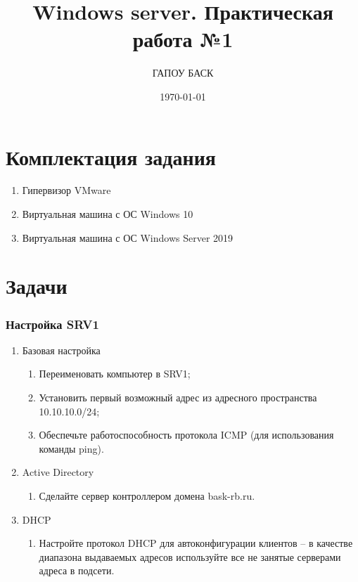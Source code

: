 \documentclass[a4paper, 12pt]{report}
\author{ГАПОУ БАСК}
\title{Windows server. Практическая работа №1}
\date{\today}
\begin{document}
	
	\maketitle
	\clearpage

	\section{Комплектация задания}

	\begin{enumerate}
		\item Гипервизор VMware
		\item Виртуальная машина с ОС Windows 10
		\item Виртуальная машина с ОС Windows Server 2019
	\end{enumerate}

	\section{Задачи}
	
	\subsubsection{Настройка SRV1}
	
	\begin{enumerate}
		\item Базовая настройка
		\begin{enumerate}
			\item Переименовать компьютер в SRV1;
			\item Установить первый возможный адрес из адресного пространства 10.10.10.0/24;
			\item Обеспечьте работоспособность протокола ICMP (для использования команды ping).
		\end{enumerate}
		\item Active Directory
		\begin{enumerate}
			\item Сделайте сервер контроллером домена bask-rb.ru.
		\end{enumerate}
		\item DHCP
		\begin{enumerate}
			\item Настройте протокол DHCP для автоконфигурации клиентов – в качестве диапазона выдаваемых адресов используйте все не занятые серверами адреса в подсети.
		\end{enumerate}
	\end{enumerate}
\end{document}
